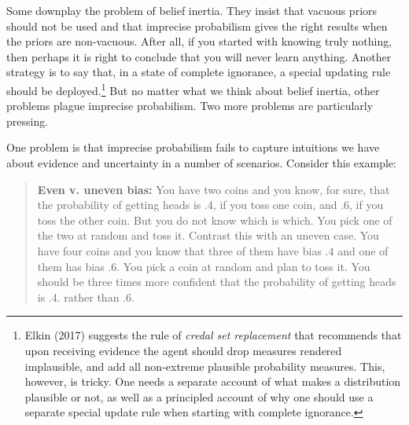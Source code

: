 \documentclass[
  10pt,
  dvipsnames,enabledeprecatedfontcommands]{scrartcl}
\begin{document}
Some downplay the problem of belief inertia. They insist that vacuous
priors should not be used and that imprecise probabilism gives the right
results when the priors are non-vacuous. After all, if you started with
knowing truly nothing, then perhaps it is right to conclude that you
will never learn anything. Another strategy is to say that, in a state
of complete ignorance, a special updating rule should be
deployed.\footnote{Elkin (2017) suggests the rule of
  \emph{credal set replacement} that recommends that upon receiving
  evidence the agent should drop measures rendered implausible, and add
  all non-extreme plausible probability measures. This, however, is
  tricky. One needs a separate account of what makes a distribution
  plausible or not, as well as a principled account of why one should
  use a separate special update rule when starting with complete
  ignorance.} But no matter what we think about belief inertia, other
problems plague imprecise probabilism. Two more problems are
particularly pressing.

One problem is that imprecise probabilism fails to capture intuitions we
have about evidence and uncertainty in a number of scenarios. Consider
this example:

\begin{quote}
\textbf{Even v. uneven bias:}
 You have two coins and you know, for sure, that the probability of getting heads is .4, if you toss one coin, and .6, if you toss the other coin. But you do not know which is which. You pick one of the two at random and toss it.  Contrast this with an uneven case. You have four coins and you know that three of them have bias $.4$ and one of them has bias $.6$. You pick a coin at random and plan to toss it. You should be three times more confident that the probability of getting heads is .4. rather than .6.
\end{quote}
\end{document}
